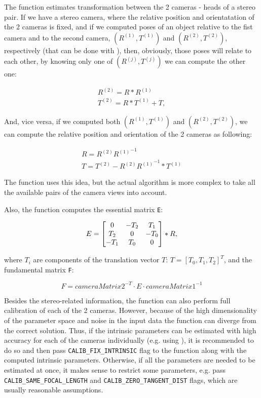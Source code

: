 The function estimates transformation between the 2 cameras - heads of a stereo pair. If we have a stereo camera, where the relative position and orientatation of the 2 cameras is fixed, and if we computed poses of an object relative to the fist camera and to the second camera, $(R^{(1)}, T^{(1)})$ and $(R^{(2)}, T^{(2)})$, respectively (that can be done with ), then, obviously, those poses will relate to each other, by knowing only one of $(R^{(j)}, T^{(j)})$ we can compute the other one:

\[\begin{array}{l}
R^{(2)}=R*R^{(1)} \\
T^{(2)}=R*T^{(1)} + T,
\end{array}
\]

And, vice versa, if we computed both $(R^{(1)}, T^{(1)})$ and $(R^{(2)}, T^{(2)})$, we can compute the relative position and orientation of the 2 cameras as following:

\[\begin{array}{l}
R=R^{(2)} {R^{(1)}}^{-1} \\
T=T^{(2)} - R^{(2)} {R^{(1)}}^{-1}*T^{(1)}
\end{array}
\]

The function uses this idea, but the actual algorithm is more complex to take all the available pairs of the camera views into account.

Also, the function computes the essential matrix \texttt{E}:

\[
E=
\begin{bmatrix} 0 & -T_2 & T_1\\ T_2 & 0 & -T_0\\ -T_1 & T_0 & 0 \end{bmatrix}
*R,
\]

where $T_i$ are components of the translation vector $T:\,T=[T_0, T_1, T_2]^T$,
and the fundamental matrix \texttt{F}:

\[F = cameraMatrix2^{-T} \cdot E \cdot cameraMatrix1^{-1}\]

Besides the stereo-related information, the function can also perform full calibration of each of the 2 cameras. However, because of the high dimensionality of the parameter space and noise in the input data the function can diverge from the correct solution. Thus, if the intrinsic parameters can be estimated with high accuracy for each of the cameras individually (e.g. using ), it is recommended to do so and then pass \texttt{CALIB\_FIX\_INTRINSIC} flag to the function along with the computed intrinsic parameters. Otherwise, if all the parameters are needed to be estimated at once, it makes sense to restrict some parameters, e.g. pass \texttt{CALIB\_SAME\_FOCAL\_LENGTH} and \texttt{CALIB\_ZERO\_TANGENT\_DIST} flags, which are usually reasonable assumptions. 


